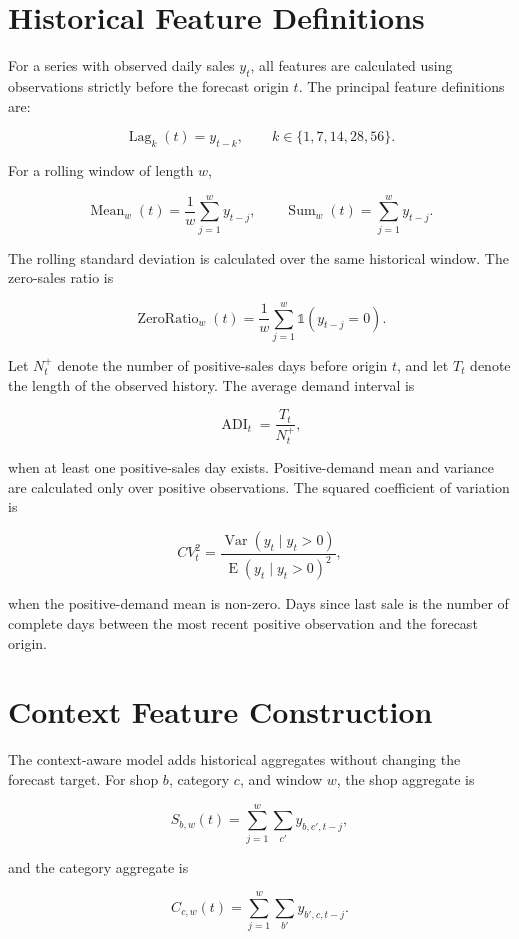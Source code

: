 \documentclass[a4paper,11pt,oneside]{book}
\theoremstyle{plain}
\theoremstyle{definition}
\theoremstyle{remark}
\begin{document}
\section{Historical Feature Definitions}

For a series with observed daily sales \(y_t\), all features are calculated
using observations strictly before the forecast origin \(t\). The principal
feature definitions are:

\[
\operatorname{Lag}_{k}(t)=y_{t-k},
\qquad k\in\{1,7,14,28,56\}.
\]

For a rolling window of length \(w\),

\[
\operatorname{Mean}_{w}(t)
=\frac{1}{w}\sum_{j=1}^{w}y_{t-j},
\qquad
\operatorname{Sum}_{w}(t)
=\sum_{j=1}^{w}y_{t-j}.
\]

The rolling standard deviation is calculated over the same historical
window. The zero-sales ratio is

\[
\operatorname{ZeroRatio}_{w}(t)
=\frac{1}{w}\sum_{j=1}^{w}\mathbb{1}(y_{t-j}=0).
\]

Let \(N_t^+\) denote the number of positive-sales days before origin \(t\),
and let \(T_t\) denote the length of the observed history. The average
demand interval is

\[
\operatorname{ADI}_t=\frac{T_t}{N_t^+},
\]

when at least one positive-sales day exists. Positive-demand mean and
variance are calculated only over positive observations. The squared
coefficient of variation is

\[
CV_t^2=
\frac{\operatorname{Var}(y_t\mid y_t>0)}
{\operatorname{E}(y_t\mid y_t>0)^2},
\]

when the positive-demand mean is non-zero. Days since last sale is the
number of complete days between the most recent positive observation
and the forecast origin.

\section{Context Feature Construction}

The context-aware model adds historical aggregates without changing the
forecast target. For shop \(b\), category \(c\), and window \(w\), the
shop aggregate is

\[
S_{b,w}(t)=
\sum_{j=1}^{w}\sum_{c'}y_{b,c',t-j},
\]

and the category aggregate is

\[
C_{c,w}(t)=
\sum_{j=1}^{w}\sum_{b'}y_{b',c,t-j}.
\]
\end{document}
